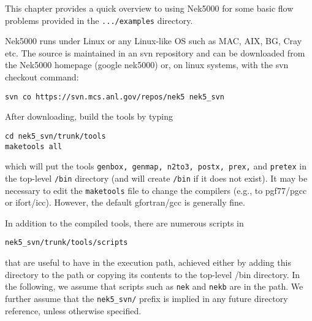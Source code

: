 This chapter provides a quick overview to using Nek5000
for some basic flow problems provided in the {\tt .../examples}
directory.
           
Nek5000 runs under Linux or any Linux-like OS such as MAC, AIX, BG, Cray etc.  
The source is maintained in an svn repository and can be downloaded
from the Nek5000 homepage (google nek5000) or, on linux systems,
with the svn checkout command:

\begin{verbatim}
svn co https://svn.mcs.anl.gov/repos/nek5 nek5_svn
\end{verbatim}
\noindent
After downloading, build the tools by typing
\begin{verbatim}
cd nek5_svn/trunk/tools
maketools all
\end{verbatim}
\noindent
which will put the tools {\tt genbox, genmap, n2to3, postx,
prex,} and {\tt pretex} in the top-level {\tt /bin} directory
(and will create {\tt /bin} if it does not exist).
It may be necessary to edit the {\tt maketools} file to change 
the compilers (e.g., to pgf77/pgcc or ifort/icc).  However,
the default gfortran/gcc is generally fine.

In addition to the compiled tools, there are numerous scripts in
\begin{verbatim}
nek5_svn/trunk/tools/scripts
\end{verbatim}
that are useful to have in the execution path, achieved 
either by adding this directory to the path or copying its
contents to the top-level /bin directory.  In the following,
we assume that scripts such as {\tt nek} and {\tt nekb}
are in the path.  We further assume that the {\tt nek5\_svn/}
prefix is implied in any future directory reference, unless
otherwise specified.

